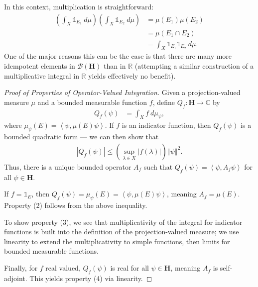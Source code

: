 \documentclass[10pt]{extarticle}
\newcommand{\R}{\mathbb{R}}
\newcommand{\C}{\mathbb{C}}
\newcommand{\iprod}[2]{\left\langle #1,#2\right\rangle}
\newcommand{\norm}[1]{\left\Vert #1\right\Vert}
\theoremstyle{plain}
\theoremstyle{definition}
\theoremstyle{remark}
\renewcommand{\newline}{\hfill\break}
\begin{document}
  In this context, multiplication is straightforward:
  \begin{align*}
    \left(\int_{X}^{} \mathbb{1}_{E_1}\:d\mu\right)\left(\int_{X}^{} \mathbb{1}_{E_2}\:d\mu\right) &= \mu(E_1)\mu(E_2)\\
                                                                                                   &= \mu(E_1 \cap E_2)\\
                                                                                                   &= \int_{X}^{} \mathbb{1}_{E_1}\mathbb{1}_{E_2}\:d\mu.
  \end{align*}
  One of the major reasons this can be the case is that there are many more idempotent elements in $\mathcal{B}(\mathbf{H})$ than in $\R$ (attempting a similar construction of a multiplicative integral in $\R$ yields effectively no benefit).
  \begin{proof}[Proof of Properties of Operator-Valued Integration]
    Given a projection-valued measure $\mu$ and a bounded measurable function $f$, define $Q_{f}: \mathbf{H}\rightarrow \C$ by
    \begin{align*}
      Q_f(\psi) &= \int_{X}^{}f \:d\mu_{\psi},
    \end{align*}
    where $\mu_{\psi}(E) = \iprod{\psi}{\mu(E)\psi}$. If $f$ is an indicator function, then $Q_f(\psi)$ is a bounded quadratic form --- we can then show that
    \begin{align*}
      |Q_f(\psi)| \leq \left(\sup_{\lambda \in X}|f(\lambda)|\right)\norm{\psi}^2.
    \end{align*}
    Thus, there is a unique bounded operator $A_f$ such that $Q_f(\psi) = \iprod{\psi}{A_f\psi}$ for all $\psi \in \mathbf{H}$.\newline

    If $f = \mathbb{1}_E$, then $Q_f(\psi) = \mu_{\psi}(E) = \iprod{\psi}{\mu(E)\psi}$, meaning $A_f = \mu(E)$. Property (2) follows from the above inequality.\newline

    To show property (3), we see that multiplicativity of the integral for indicator functions is built into the definition of the projection-valued measure; we use linearity to extend the multiplicativity to simple functions, then limits for bounded measurable functions.\newline

    Finally, for $f$ real valued, $Q_f(\psi)$ is real for all $\psi \in \mathbf{H}$, meaning $A_f$ is self-adjoint. This yields property (4) via linearity.
  \end{proof}
\end{document}
